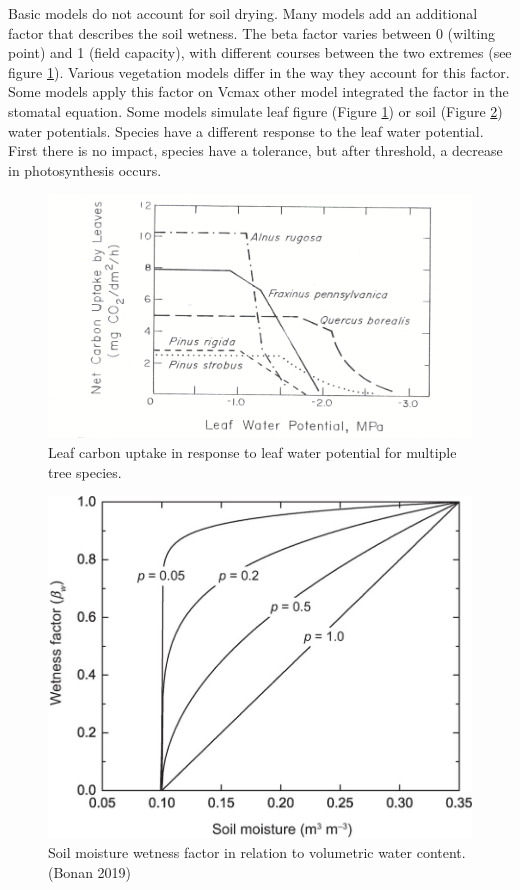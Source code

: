 \documentclass[
  12pt,
  oneside]{book}
\begin{document}
Basic models do not account for soil drying. Many models add an additional factor that describes the soil wetness. The beta factor varies between 0 (wilting point) and 1 (field capacity), with different courses between the two extremes (see figure \ref{fig:f216}). Various vegetation models differ in the way they account for this factor. Some models apply this factor on Vcmax other model integrated the factor in the stomatal equation.
Some models simulate leaf figure (Figure \ref{fig:f216}) or soil (Figure \ref{fig:f217}) water potentials. Species have a different response to the leaf water potential. First there is no impact, species have a tolerance, but after threshold, a decrease in photosynthesis occurs.

\begin{figure}

{\centering \includegraphics[width=0.8\linewidth]{figures/chap2/leafWP} 

}

\caption{Leaf carbon uptake in response to leaf water potential for multiple tree species.}\label{fig:f216}
\end{figure}

\begin{figure}

{\centering \includegraphics[width=0.8\linewidth]{figures/chap2/SWfactor} 

}

\caption{Soil moisture wetness factor in relation to volumetric water content. (Bonan 2019)}\label{fig:f217}
\end{figure}
\end{document}

